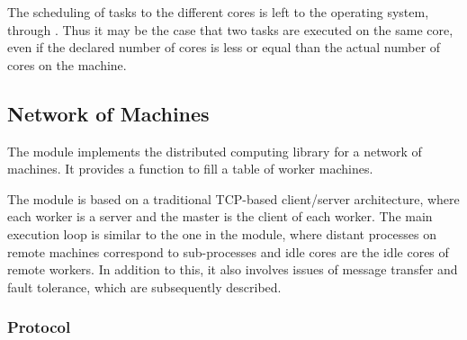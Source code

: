 \documentclass[a4paper,12pt]{article}
\begin{document}
The scheduling of tasks to the different cores is left to the
operating system, through . Thus it may be the case that
two tasks are executed on the same core, even if the declared number
of cores is less or equal than the actual number of cores on the machine.

\subsection{Network of Machines}

The  module implements the distributed computing library
for a network of machines. 
It provides a function
 to fill a table of
worker machines. 

The  module is based on a traditional TCP-based client/server
architecture, where each worker is a server and the master is the
client of each worker. The main execution loop is similar to the one
in the  module, where distant processes on remote machines
correspond to sub-processes and idle cores are the idle cores 
of remote workers. In addition to this, it also involves issues of message
transfer and fault tolerance, which are subsequently described.

\subsubsection{Protocol}\label{sec:protocol}
\end{document}
